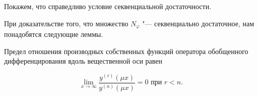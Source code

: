 \smallskip



    Покажем, что справедливо условие секвенциальной достаточности.



\smallskip



 При доказательстве того, что множество $N_\varphi$ "--- секвенциально достаточное, нам понадобятся следующие леммы.



\smallskip



\hypertarget{napalk:lemma2}{}



\begin{lemma}[2]Предел отношения производных собственных функций оператора обобщенного дифференцирования вдоль вещественной оси равен

\begin{equation*}\lim\limits_{x\to \infty}\frac{y^{(r)}(\mu x)}{y^{(n)}(\mu x)}=0 \text{  при   }r < n. \end{equation*}

\end{lemma}

\smallskip



